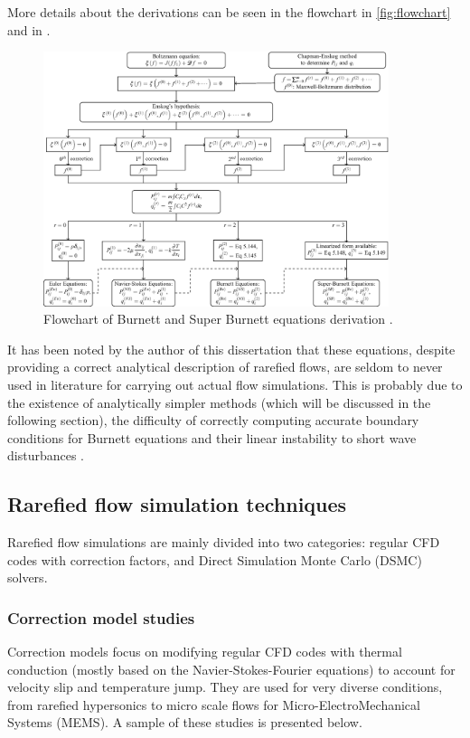 More details about the derivations can be seen in the flowchart in \autoref{fig:flowchart} and in \cite{burnett}.

\begin{figure}[ht]
    \centering
    \includegraphics[width=0.9\textwidth]{../Images/2. Background/burnettflowchart.png}
    \caption{Flowchart of Burnett and Super Burnett equations derivation \cite{burnett}.}
    \label{fig:flowchart}
\end{figure}

It has been noted by the author of this dissertation that these equations, despite providing a correct analytical description of rarefied flows, are seldom to never used in literature for carrying out actual flow simulations. This is probably due to the existence of analytically simpler methods (which will be discussed in the following section), the difficulty of correctly computing accurate boundary conditions for Burnett equations and their linear instability to short wave disturbances \cite{comprarefied}.

\subsection{Rarefied flow simulation techniques}
Rarefied flow simulations are mainly divided into two categories: regular CFD codes with correction factors, and Direct Simulation Monte Carlo (DSMC) solvers.

\subsubsection{Correction model studies}

Correction models focus on modifying regular CFD codes with thermal conduction (mostly based on the Navier-Stokes-Fourier equations) to account for velocity slip and temperature jump. They are used for very diverse conditions, from rarefied hypersonics to micro scale flows for Micro-ElectroMechanical Systems (MEMS). A sample of these studies is presented below.

